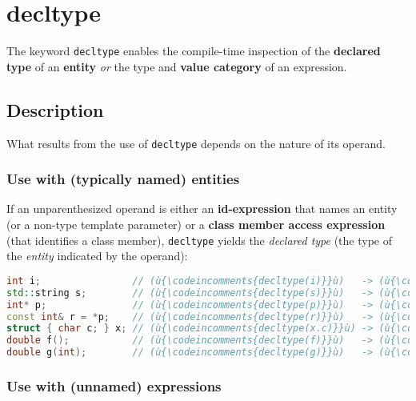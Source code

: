 \newpage
\section[\tt{decltype}]{{\SecCode decltype}}\label{decltype}


The keyword \texttt{decltype} enables the compile-time inspection of the \textbf{declared type} of an \textbf{entity} \textit{or} the type and
\textbf{value category} of an expression.

\subsection[Description]{Description}\label{description}

What results from the use of \texttt{decltype} depends on the nature of
its operand.

\subsubsection[Use with (typically named) entities]{Use with (typically named) entities}\label{use-with-(typically-named)-entities}

If an unparenthesized operand is either an \textbf{id-expression} that names an entity (or a non-type template parameter) or a \textbf{class member access expression} (that identifies a class member), \texttt{decltype} yields the \emph{declared type} (the type of the \emph{entity} indicated by the operand):

\begin{lstlisting}[language=C++]
int i;                // (ù{\codeincomments{decltype(i)}}ù)   -> (ù{\codeincomments{int}}ù)
std::string s;        // (ù{\codeincomments{decltype(s)}}ù)   -> (ù{\codeincomments{std::string}}ù)
int* p;               // (ù{\codeincomments{decltype(p)}}ù)   -> (ù{\codeincomments{int}}ù)*
const int& r = *p;    // (ù{\codeincomments{decltype(r)}}ù)   -> (ù{\codeincomments{const int\&}}ù)
struct { char c; } x; // (ù{\codeincomments{decltype(x.c)}}ù) -> (ù{\codeincomments{char}}ù)
double f();           // (ù{\codeincomments{decltype(f)}}ù)   -> (ù{\codeincomments{double()}}ù)
double g(int);        // (ù{\codeincomments{decltype(g)}}ù)   -> (ù{\codeincomments{double(int)}}ù)
\end{lstlisting}


\subsubsection[Use with (unnamed) expressions]{Use with (unnamed) expressions}\label{use-with-(unnamed)-expressions}


